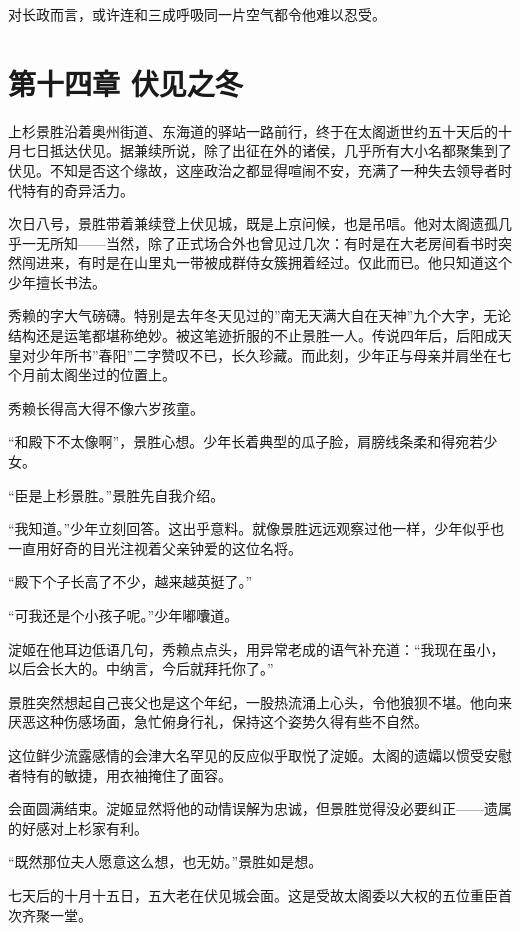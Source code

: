 \documentclass[
]{book}
\begin{document}
对长政而言，或许连和三成呼吸同一片空气都令他难以忍受。

\chapter*{第十四章 伏见之冬}\label{ux7b2cux5341ux56dbux7ae0-ux4f0fux89c1ux4e4bux51ac}

上杉景胜沿着奥州街道、东海道的驿站一路前行，终于在太阁逝世约五十天后的十月七日抵达伏见。据兼续所说，除了出征在外的诸侯，几乎所有大小名都聚集到了伏见。不知是否这个缘故，这座政治之都显得喧闹不安，充满了一种失去领导者时代特有的奇异活力。

次日八号，景胜带着兼续登上伏见城，既是上京问候，也是吊唁。他对太阁遗孤几乎一无所知------当然，除了正式场合外也曾见过几次：有时是在大老房间看书时突然闯进来，有时是在山里丸一带被成群侍女簇拥着经过。仅此而已。他只知道这个少年擅长书法。

秀赖的字大气磅礴。特别是去年冬天见过的''南无天满大自在天神''九个大字，无论结构还是运笔都堪称绝妙。被这笔迹折服的不止景胜一人。传说四年后，后阳成天皇对少年所书''春阳''二字赞叹不已，长久珍藏。而此刻，少年正与母亲并肩坐在七个月前太阁坐过的位置上。

秀赖长得高大得不像六岁孩童。

``和殿下不太像啊''，景胜心想。少年长着典型的瓜子脸，肩膀线条柔和得宛若少女。

``臣是上杉景胜。''景胜先自我介绍。

``我知道。''少年立刻回答。这出乎意料。就像景胜远远观察过他一样，少年似乎也一直用好奇的目光注视着父亲钟爱的这位名将。

``殿下个子长高了不少，越来越英挺了。''

``可我还是个小孩子呢。''少年嘟囔道。

淀姬在他耳边低语几句，秀赖点点头，用异常老成的语气补充道：``我现在虽小，以后会长大的。中纳言，今后就拜托你了。''

景胜突然想起自己丧父也是这个年纪，一股热流涌上心头，令他狼狈不堪。他向来厌恶这种伤感场面，急忙俯身行礼，保持这个姿势久得有些不自然。

这位鲜少流露感情的会津大名罕见的反应似乎取悦了淀姬。太阁的遗孀以惯受安慰者特有的敏捷，用衣袖掩住了面容。

会面圆满结束。淀姬显然将他的动情误解为忠诚，但景胜觉得没必要纠正------遗属的好感对上杉家有利。

``既然那位夫人愿意这么想，也无妨。''景胜如是想。

七天后的十月十五日，五大老在伏见城会面。这是受故太阁委以大权的五位重臣首次齐聚一堂。
\end{document}
